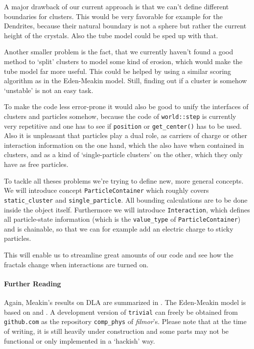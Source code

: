 \documentclass[twocolumn,10pt]{scrartcl}
\begin{document}
            A major drawback of our current approach is that we can't define different boundaries for clusters. This
            would be very favorable for example for the Dendrites, because their natural boundary is not a sphere but
            rather the current height of the crystals. Also the tube model could be sped up with that.

            Another smaller problem is the fact, that we currently haven't found a good method to `split' clusters to
            model some kind of erosion, which would make the tube model far more useful. This could be helped by using a
            similar scoring algorithm as in the Eden-Meakin model. Still, finding out if a cluster is somehow `unstable'
            is not an easy task.

            To make the code less error-prone it would also be good to unify the interfaces of clusters and particles
            somehow, because the code of \lstinline'world::step' is currently very repetitive and one has to see if
            \lstinline'position' or \lstinline'get_center()' has to be used. Also it is unpleasant that particles play
            a dual role, as carriers of charge or other interaction information on the one hand, which the also have
            when contained in clusters, and as a kind of `single-particle clusters' on the other, which they only
            have as free particles.

            To tackle all theses problems we're trying to define new, more general concepts. We will introduce concept
            \lstinline'ParticleContainer' which roughly covers \lstinline'static_cluster' and
            \lstinline'single_particle'. All bounding calculations are to be done inside the object itself. Furthermore
            we will introduce \lstinline'Interaction', which defines all particle-state information (which is the
            \lstinline'value_type' of \lstinline'ParticleContainer') and is chainable, so that we can for example add
            an electric charge to sticky particles.

            This will enable us to streamline great amounts of our code and see how the fractals change when
            interactions are turned on.

        {\small
            \paragraph{Further Reading}
            Again, Meakin's results on DLA are summarized in \cite{src-meakin1}. The Eden-Meakin model is based
            on \cite{src-eden} and \cite{src-meakin-eden}.
            A development version of \texttt{trivial} can freely be obtained from \texttt{github.com} as the
            repository \texttt{comp\_phys} of \emph{filmor}'s. Please note that at the time of writing, it is still
            heavily under construction and some parts may not be functional or only implemented in a `hackish' way.
        }            
\end{document}
